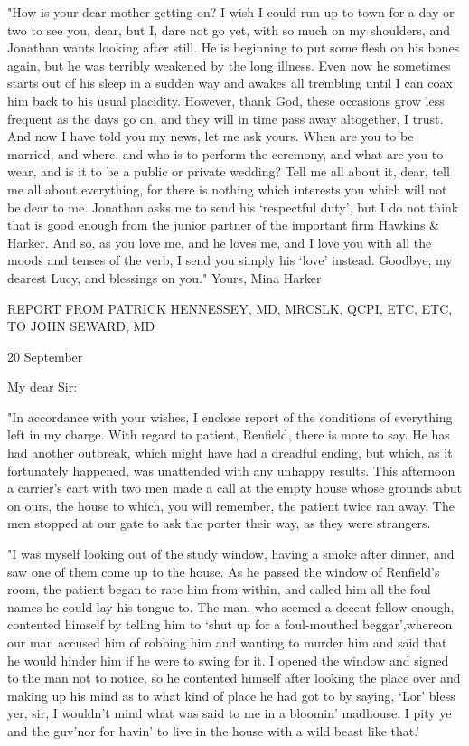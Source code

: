 "How is your dear mother getting on? I wish I could run up to town for a day or two to see you, dear, but I, dare not go yet, with so much on my shoulders, and Jonathan wants looking after still. He is beginning to put some flesh on his bones again, but he was terribly weakened by the long illness. Even now he sometimes starts out of his sleep in a sudden way and awakes all trembling until I can coax him back to his usual placidity. However, thank God, these occasions grow less frequent as the days go on, and they will in time pass away altogether, I trust. And now I have told you my news, let me ask yours. When are you to be married, and where, and who is to perform the ceremony, and what are you to wear, and is it to be a public or private wedding? Tell me all about it, dear, tell me all about everything, for there is nothing which interests you which will not be dear to me. Jonathan asks me to send his `respectful duty', but I do not think that is good enough from the junior partner of the important firm Hawkins & Harker. And so, as you love me, and he loves me, and I love you with all the moods and tenses of the verb, I send you simply his `love' instead. Goodbye, my dearest Lucy, and blessings on you." Yours, Mina Harker 

REPORT FROM PATRICK HENNESSEY, MD, MRCSLK, QCPI, ETC, ETC, TO JOHN SEWARD, MD 

20 September 

My dear Sir: 

"In accordance with your wishes, I enclose report of the conditions of everything left in my charge. With regard to patient, Renfield, there is more to say. He has had another outbreak, which might have had a dreadful ending, but which, as it fortunately happened, was unattended with any unhappy results. This afternoon a carrier's cart with two men made a call at the empty house whose grounds abut on ours, the house to which, you will remember, the patient twice ran away. The men stopped at our gate to ask the porter their way, as they were strangers. 

"I was myself looking out of the study window, having a smoke after dinner, and saw one of them come up to the house. As he passed the window of Renfield's room, the patient began to rate him from within, and called him all the foul names he could lay his tongue to. The man, who seemed a decent fellow enough, contented himself by telling him to `shut up for a foul-mouthed beggar',whereon our man accused him of robbing him and wanting to murder him and said that he would hinder him if he were to swing for it. I opened the window and signed to the man not to notice, so he contented himself after looking the place over and making up his mind as to what kind of place he had got to by saying, `Lor' bless yer, sir, I wouldn't mind what was said to me in a bloomin' madhouse. I pity ye and the guv'nor for havin' to live in the house with a wild beast like that.' 

